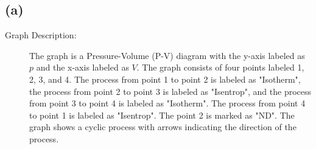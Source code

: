 

\subsection*{(a)}

\begin{description}
    \item[Graph Description:] The graph is a Pressure-Volume (P-V) diagram with the y-axis labeled as $p$ and the x-axis labeled as $V$. The graph consists of four points labeled 1, 2, 3, and 4. The process from point 1 to point 2 is labeled as "Isotherm", the process from point 2 to point 3 is labeled as "Isentrop", and the process from point 3 to point 4 is labeled as "Isotherm". The process from point 4 to point 1 is labeled as "Isentrop". The point 2 is marked as "ND". The graph shows a cyclic process with arrows indicating the direction of the process.
\end{description}